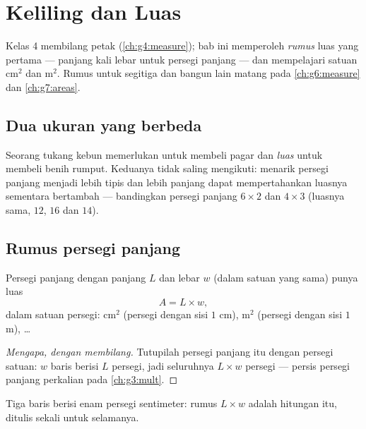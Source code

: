 \chapter{Keliling dan Luas}\label{ch:g5:areas}

Kelas 4 membilang petak (\cref{ch:g4:measure}); bab ini memperoleh
\emph{rumus} luas yang pertama --- panjang kali lebar untuk persegi
panjang --- dan mempelajari satuan cm$^2$ dan m$^2$. Rumus untuk
segitiga dan bangun lain matang pada \cref{ch:g6:measure} dan
\cref{ch:g7:areas}.

\section{Dua ukuran yang berbeda}

\begin{example}\label{ex:g5:areas:contrast}
Seorang tukang kebun memerlukan \emph{} untuk membeli pagar
dan \emph{luas} untuk membeli benih rumput. Keduanya tidak saling
mengikuti: menarik persegi panjang menjadi lebih tipis dan lebih
panjang dapat mempertahankan luasnya sementara  bertambah
--- bandingkan persegi panjang $6 \times 2$ dan $4 \times 3$ (luasnya
sama, $12$,  $16$ dan $14$).
\end{example}

\section{Rumus persegi panjang}

\begin{proposition}\label{prop:g5:areas:rectangle}
Persegi panjang dengan panjang $L$ dan lebar $w$ (dalam satuan yang sama) punya luas
\[
A = L \times w ,
\]
dalam satuan persegi: cm$^2$ (persegi dengan sisi $1$ cm), m$^2$
(persegi dengan sisi $1$ m), \dots
\end{proposition}

\begin{proof}[Mengapa, dengan membilang]
Tutupilah persegi panjang itu dengan persegi satuan: $w$ baris
berisi $L$ persegi, jadi seluruhnya $L \times w$ persegi --- persis
persegi panjang perkalian pada \cref{ch:g3:mult}.
\end{proof}

\begin{omfigure}

{\small Tiga baris berisi enam persegi sentimeter: rumus
$L \times w$ adalah hitungan itu, ditulis sekali untuk selamanya.}
\end{omfigure}

